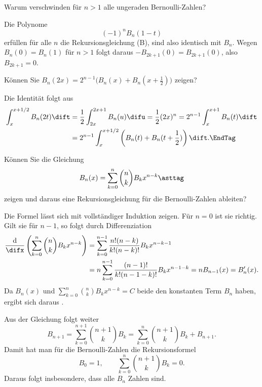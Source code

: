   \begin{frage}
    Warum verschwinden für $n>1$ alle ungeraden Bernoulli-Zahlen?
  \end{frage}

  \begin{antwort}
    Die Polynome 
    \[
    (-1)^n B_n( 1-t )
    \]
    erfüllen für alle $n$ die Rekursionsgleichung (B), sind also 
    identisch mit $B_n$. Wegen $B_n(0)=B_n(1)$ für $n>1$ folgt daraus 
    $-B_{2k+1}(0)=B_{2k+1}(0)$, also $B_{2k+1}=0$.
    \AntEnd
  \end{antwort}

  \begin{frage}\label{04_berab}
    Können Sie $B_n(2x)=2^{n-1} \big( B_n(x)+B_n(x+\frac{1}{2}) \big) $
    zeigen?
  \end{frage}

  \begin{antwort}
    Die Identität folgt aus 
    \begin{align}
      \int_x^{x+1/2} B_n(2t) \dift &= 
      \frac{1}{2} \int_{2x}^{2x+1} B_n(u)\difu = 
      \frac{1}{2}(2x)^n = 2^{n-1} \int_x^{x+1} B_n(t)\dift \notag \\
      &= 2^{n-1} \int_x^{x+1/2} \left( B_n(t) + B_n(t+\frac{1}{2}) \right) \dift.
      \EndTag
    \end{align}
  \end{antwort}

  \begin{frage}
    Können Sie die Gleichung 
    \begin{equation}
      B_n (x) = \sum_{k=0}^n \binom{n}{k} B_k x^{n-k} 
      \asttag
    \end{equation}
    zeigen und daraus eine Rekursionsgleichung für die Bernoulli-Zahlen 
    ableiten?
  \end{frage}

  \begin{antwort}
    Die Formel lässt sich mit vollständiger 
    Induktion zeigen. Für $n=0$ ist 
    sie richtig. Gilt sie für $n-1$, so folgt durch Differenziation
    \begin{align*}
      \frac{\mathrm{d}}{\difx}
      \left( \sum_{k=0}^n \binom{n}{k} B_k x^{n-k} \right) &=  
      \sum_{k=0}^{n-1} \frac{n! (n-k)}{k!(n-k)!} B_k x^{n-k-1} \\
      &= n \sum_{k=0}^{n-1} \frac{(n-1)!}{k!(n-1-k)!} B_k x^{n-1-k}
      = nB_{n-1}(x)=B_n'(x).
    \end{align*}
    Da $B_n(x)$ und $\sum_{k=0}^n \binom{n}{k} B_k x^{n-k}=C$ beide den 
    konstanten Term $B_n$ haben, ergibt sich daraus {\astref}.


    Aus der Gleichung folgt weiter
    \[ 
    B_{n+1}=\sum_{k=0}^{n+1}\binom{n+1}{k} B_k = 
    \sum_{k=0}^{n}\binom{n+1}{k} B_k + B_{n+1}.
    \] 
    Damit hat man für die Bernoulli-Zahlen die Rekursionsformel
    \begin{equation}
      B_0=1, \qquad \sum_{k=0}^n \binom{n+1}{k} B_k = 0.
      \tag{B*}
    \end{equation}
    Daraus folgt insbesondere, dass alle 
    $B_n$  Zahlen sind.  \AntEnd
  \end{antwort}


